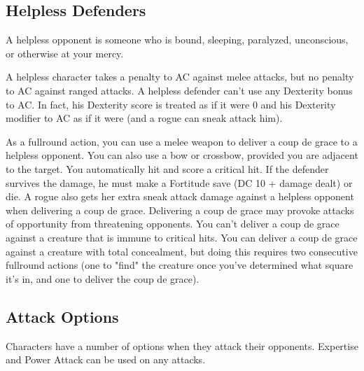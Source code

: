 \subsection{Helpless Defenders}

A helpless opponent is someone who is bound, sleeping, paralyzed, unconscious, or otherwise at your mercy.

\vspace*{10pt}

A helpless character takes a  penalty to AC against melee attacks, but no penalty to AC against ranged attacks.
A helpless defender can't use any Dexterity bonus to AC. In fact, his Dexterity score is treated as if it were 0 and his Dexterity modifier to AC as if it were  (and a rogue can sneak attack him).

As a full\textendash round action, you can use a melee weapon to deliver a coup de grace to a helpless opponent. You can also use a bow or crossbow, provided you are adjacent to the target. You automatically hit and score a critical hit. If the defender survives the damage, he must make a Fortitude save (DC 10 + damage dealt) or die. A rogue also gets her extra sneak attack damage against a helpless opponent when delivering a coup de grace. Delivering a coup de grace may provoke attacks of opportunity from threatening opponents. You can't deliver a coup de grace against a creature that is immune to critical hits. You can deliver a coup de grace against a creature with total concealment, but doing this requires two consecutive full\textendash round actions (one to "find" the creature once you've determined what square it's in, and one to deliver the coup de grace).

\subsection{Attack Options}

Characters have a number of options when they attack their opponents. Expertise and Power Attack can be used on any attacks.


